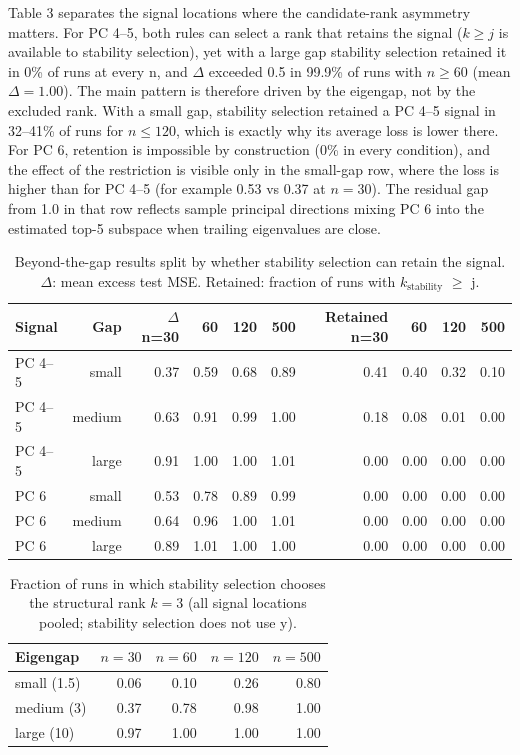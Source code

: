 \documentclass[11pt]{article}
\begin{document}
Table 3 separates the signal locations where the candidate-rank asymmetry matters. For PC 4--5, both rules can select a rank that retains the signal ($k\geq j$ is available to stability selection), yet with a large gap stability selection retained it in 0\% of runs at every n, and $\Delta$ exceeded 0.5 in 99.9\% of runs with $n\geq 60$ (mean $\Delta=1.00$). The main pattern is therefore driven by the eigengap, not by the excluded rank. With a small gap, stability selection retained a PC 4--5 signal in 32--41\% of runs for $n\leq 120$, which is exactly why its average loss is lower there. For PC 6, retention is impossible by construction (0\% in every condition), and the effect of the restriction is visible only in the small-gap row, where the loss is higher than for PC 4--5 (for example 0.53 vs 0.37 at $n=30$). The residual gap from 1.0 in that row reflects sample principal directions mixing PC 6 into the estimated top-5 subspace when trailing eigenvalues are close.\par

\begin{table}[!htbp]
\centering
\caption{Beyond-the-gap results split by whether stability selection can retain the signal. $\Delta$: mean excess test MSE. Retained: fraction of runs with $k_{\mathrm{stability}}$ $\geq$ j.}
\scriptsize
\setlength{\tabcolsep}{3.2pt}
\begin{tabular}{@{}lrrrrrrrrr@{}}
\toprule
Signal & Gap & $\Delta$ n=30 & 60 & 120 & 500 & Retained n=30 & 60 & 120 & 500 \\
\midrule
PC 4--5 & small & 0.37 & 0.59 & 0.68 & 0.89 & 0.41 & 0.40 & 0.32 & 0.10 \\
PC 4--5 & medium & 0.63 & 0.91 & 0.99 & 1.00 & 0.18 & 0.08 & 0.01 & 0.00 \\
PC 4--5 & large & 0.91 & 1.00 & 1.00 & 1.01 & 0.00 & 0.00 & 0.00 & 0.00 \\
PC 6 & small & 0.53 & 0.78 & 0.89 & 0.99 & 0.00 & 0.00 & 0.00 & 0.00 \\
PC 6 & medium & 0.64 & 0.96 & 1.00 & 1.01 & 0.00 & 0.00 & 0.00 & 0.00 \\
PC 6 & large & 0.89 & 1.01 & 1.00 & 1.00 & 0.00 & 0.00 & 0.00 & 0.00 \\
\bottomrule
\end{tabular}
\end{table}

\begin{table}[!htbp]
\centering
\caption{Fraction of runs in which stability selection chooses the structural rank $k=3$ (all signal locations pooled; stability selection does not use y).}
\scriptsize
\setlength{\tabcolsep}{3.2pt}
\begin{tabular}{@{}lrrrr@{}}
\toprule
Eigengap & $n=30$ & $n=60$ & $n=120$ & $n=500$ \\
\midrule
small (1.5) & 0.06 & 0.10 & 0.26 & 0.80 \\
medium (3) & 0.37 & 0.78 & 0.98 & 1.00 \\
large (10) & 0.97 & 1.00 & 1.00 & 1.00 \\
\bottomrule
\end{tabular}
\end{table}
\end{document}
